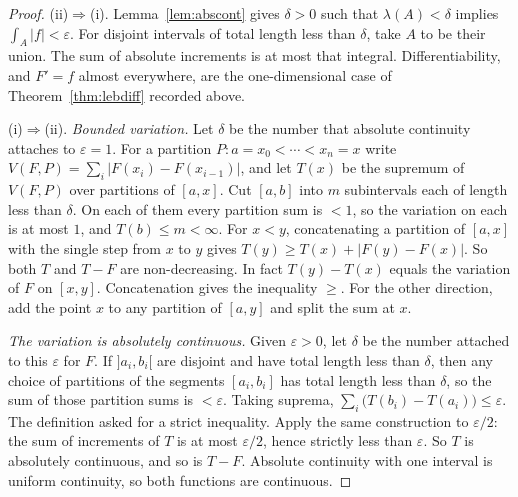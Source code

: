 \begin{proof}
(ii)$\Rightarrow$(i). Lemma~\ref{lem:abscont} gives $\delta>0$ such that $\lambda(A)<\delta$ implies $\int_A|f|<\varepsilon$. For disjoint intervals of total length less than $\delta$, take $A$ to be their union. The sum of absolute increments is at most that integral. Differentiability, and $F'=f$ almost everywhere, are the one-dimensional case of Theorem~\ref{thm:lebdiff} recorded above.

(i)$\Rightarrow$(ii). \emph{Bounded variation.} Let $\delta$ be the number that absolute continuity attaches to $\varepsilon=1$. For a partition $P:a=x_0<\cdots<x_n=x$ write $V(F,P)=\sum_i|F(x_i)-F(x_{i-1})|$, and let $T(x)$ be the supremum of $V(F,P)$ over partitions of $[a,x]$. Cut $[a,b]$ into $m$ subintervals each of length less than $\delta$. On each of them every partition sum is $<1$, so the variation on each is at most $1$, and $T(b)\le m<\infty$. For $x<y$, concatenating a partition of $[a,x]$ with the single step from $x$ to $y$ gives $T(y)\ge T(x)+|F(y)-F(x)|$. So both $T$ and $T-F$ are non-decreasing. In fact $T(y)-T(x)$ equals the variation of $F$ on $[x,y]$. Concatenation gives the inequality $\ge$. For the other direction, add the point $x$ to any partition of $[a,y]$ and split the sum at $x$.

\emph{The variation is absolutely continuous.} Given $\varepsilon>0$, let $\delta$ be the number attached to this $\varepsilon$ for $F$. If $]a_i,b_i[$ are disjoint and have total length less than $\delta$, then any choice of partitions of the segments $[a_i,b_i]$ has total length less than $\delta$, so the sum of those partition sums is $<\varepsilon$. Taking suprema, $\sum_i\bigl(T(b_i)-T(a_i)\bigr)\le\varepsilon$. The definition asked for a strict inequality. Apply the same construction to $\varepsilon/2$: the sum of increments of $T$ is at most $\varepsilon/2$, hence strictly less than $\varepsilon$. So $T$ is absolutely continuous, and so is $T-F$. Absolute continuity with one interval is uniform continuity, so both functions are continuous.


\end{proof}
